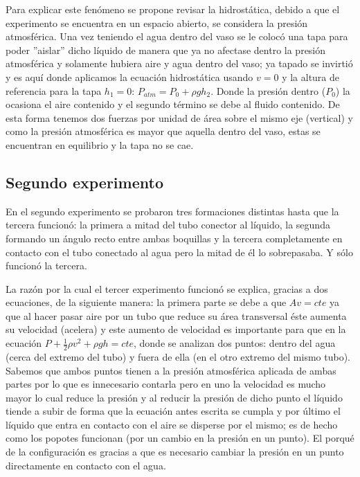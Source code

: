 \documentclass[10pt,a4paper]{article}
\begin{document}
Para explicar este fenómeno se propone revisar la hidrostática, debido a que el experimento se encuentra en un espacio abierto, se considera la presión atmosférica. Una vez teniendo el agua dentro del vaso se le colocó una tapa para poder ''aislar'' dicho líquido de manera que ya no afectase dentro la presión atmosférica y solamente hubiera aire y agua dentro del vaso; ya tapado se invirtió y es aquí donde aplicamos la ecuación hidrostática usando $v=0$ y la altura de referencia para la tapa $h_1=0$: $P_{atm} = P_0 + \rho g h_2$. Donde la presión dentro ($P_0$) la ocasiona el aire contenido y el segundo término se debe al fluido contenido. De esta forma tenemos dos fuerzas por unidad de área sobre el mismo eje (vertical) y como la presión atmosférica es mayor que aquella dentro del vaso, estas se encuentran en equilibrio y la tapa no se cae.




\subsection*{Segundo experimento}
En el segundo experimento se probaron tres formaciones distintas hasta que la tercera funcionó: la primera a mitad del tubo conector al líquido, la segunda formando un ángulo recto entre ambas boquillas y la tercera completamente en contacto con el tubo conectado al agua pero la mitad de él lo sobrepasaba. Y sólo funcionó la tercera.

La razón por la cual el tercer experimento funcionó se explica, gracias a dos ecuaciones, de la siguiente manera: la primera parte se debe a que $Av = cte$ ya que al hacer pasar aire por un tubo que reduce su área transversal éste aumenta su velocidad (acelera) y este aumento de velocidad es importante para que en la ecuación $P + \frac{1}{2}\rho v^2 + \rho g h = cte$, donde se analizan dos puntos: dentro del agua (cerca del extremo del tubo) y fuera de ella (en el otro extremo del mismo tubo). Sabemos que ambos puntos tienen a la presión atmosférica aplicada de ambas partes por lo que es innecesario contarla pero en uno la velocidad es mucho mayor lo cual reduce la presión y al reducir la presión de dicho punto el líquido tiende a subir de forma que la ecuación antes escrita se cumpla y por último el líquido que entra en contacto con el aire se disperse por el mismo; es de hecho como los popotes funcionan (por un cambio en la presión en un punto). El porqué de la configuración es gracias a que es necesario cambiar la presión en un punto directamente en contacto con el agua.
\end{document}
